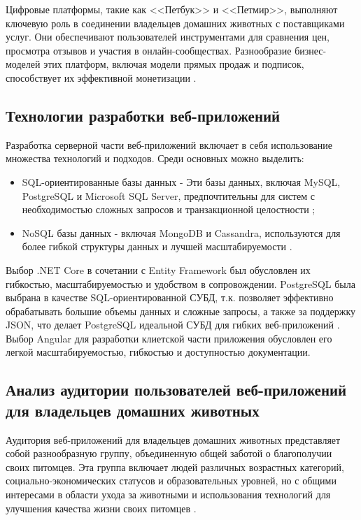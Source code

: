 Цифровые платформы, такие как <<Петбук>> и <<Петмир>>, выполняют ключевую роль в соединении владельцев домашних животных с поставщиками услуг. Они обеспечивают пользователей инструментами для сравнения цен, просмотра отзывов и участия в онлайн-сообществах. Разнообразие бизнес-моделей этих платформ, включая модели прямых продаж и подписок, способствует их эффективной монетизации \cite{market}.

\subsection{Технологии разработки веб-приложений}

Разработка серверной части веб-приложений включает в себя использование множества технологий и подходов. Среди основных можно выделить:

\begin{itemize}
  \item SQL-ориентированные базы данных -\- Эти базы данных, включая MySQL, PostgreSQL и Microsoft SQL Server, предпочтительны для систем с необходимостью сложных запросов и транзакционной целостности \cite{freedman};
  \item NoSQL базы данных -\- включая MongoDB и Cassandra, используются для более гибкой структуры данных и лучшей масштабируемости \cite{market}.
\end{itemize}

Выбор .NET Core в сочетании с Entity Framework был обусловлен их гибкостью, масштабируемостью и удобством в сопровождении.
PostgreSQL была выбрана в качестве SQL-ориентированной СУБД, т.к. позволяет эффективно обрабатывать большие объемы данных и сложные запросы, а также за поддержку JSON, что делает PostgreSQL идеальной СУБД для гибких веб-приложений \cite{freedman}.
Выбор Angular для разработки клиетской части приложения обусловлен его легкой масштабируемостью, гибкостью и доступностью документации.

\subsection{Анализ аудитории пользователей веб-приложений для владельцев домашних животных}

Аудитория веб-приложений для владельцев домашних животных представляет собой разнообразную группу, объединенную общей заботой о благополучии своих питомцев. Эта группа включает людей различных возрастных категорий, социально-экономических статусов и образовательных уровней, но с общими интересами в области ухода за животными и использования технологий для улучшения качества жизни своих питомцев \cite{market}.

